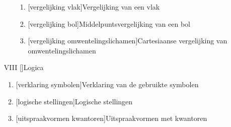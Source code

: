 \documentclass{article}
\begin{document}
\begin{itemize}
\begin{enumerate}
\begin{enumerate}
\item {}[vergelijking vlak]{Vergelijking van een vlak}
\item {}[vergelijking bol]{Middelpuntsvergelijking van een bol}
\item {}[vergelijking omwentelingslichamen]{Cartesiaanse vergelijking van omwentelingslichamen}
\end{enumerate}%
\end{enumerate}%
\item[VIII] []{Logica}
\begin{enumerate}%
\item {}[verklaring symbolen]{Verklaring van de gebruikte symbolen}
\item {}[logische stellingen]{Logische stellingen}
\item {}[uitspraakvormen kwantoren]{Uitspraakvormen met kwantoren}
\end{enumerate}%
\end{itemize}%
\end{document}
